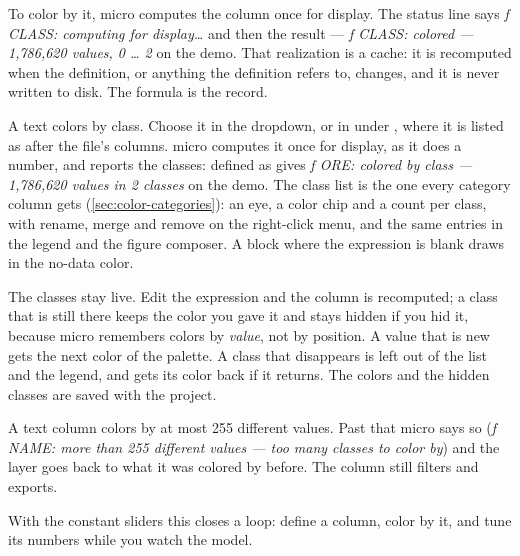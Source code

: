 To color by it, micro computes the column once for display. The status line says \emph{ƒ CLASS: computing for display…} and then the result — \emph{ƒ CLASS: colored — 1,786,620 values, 0 … 2} on the demo. That realization is a cache: it is recomputed when the definition, or anything the definition refers to, changes, and it is never written to disk. The formula is the record.

A text  colors by class. Choose it in the  dropdown, or in  under , where it is listed as  after the file's columns. micro computes it once for display, as it does a number, and reports the classes:  defined as  gives \emph{ƒ ORE: colored by class — 1,786,620 values in 2 classes} on the demo. The class list is the one every category column gets (\cref{sec:color-categories}): an eye, a color chip and a count per class, with rename, merge and remove on the right-click menu, and the same entries in the legend and the figure composer. A block where the expression is blank draws in the no-data color.

The classes stay live. Edit the expression and the column is recomputed; a class that is still there keeps the color you gave it and stays hidden if you hid it, because micro remembers colors by \emph{value}, not by position. A value that is new gets the next color of the palette. A class that disappears is left out of the list and the legend, and gets its color back if it returns. The colors and the hidden classes are saved with the project.

A text column colors by at most 255 different values. Past that micro says so (\emph{ƒ NAME: more than 255 different values — too many classes to color by}) and the layer goes back to what it was colored by before. The column still filters and exports.

With the constant sliders this closes a loop: define a column, color by it, and tune its numbers while you watch the model.

